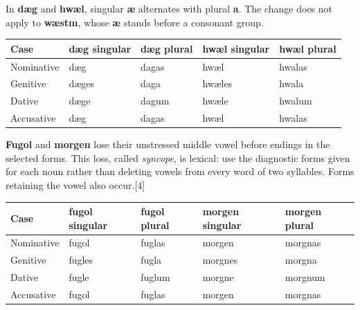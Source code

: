 In \textbf{dæg} and \textbf{hwæl}, singular \textbf{æ} alternates with plural \textbf{a}. The change does not apply to \textbf{wæstm}, whose \textbf{æ} stands before a consonant group.

\par\begingroup
\fontsize{10.5}{13.2}\selectfont
\setlength{\LTleft}{0pt}\setlength{\LTright}{\fill}
\noindent
\begin{tabular}{@{}>{\raggedright\arraybackslash}p{22.0mm}>{\raggedright\arraybackslash}p{22.688mm}>{\raggedright\arraybackslash}p{22.688mm}>{\raggedright\arraybackslash}p{22.688mm}>{\raggedright\arraybackslash}p{22.688mm}@{}}
\toprule
\textbf{Case} & \textbf{dæg singular} & \textbf{dæg plural} & \textbf{hwæl singular} & \textbf{hwæl plural} \\
\midrule
Nominative & dæg & dagas & hwæl & hwalas \\
Genitive & dæges & daga & hwæles & hwala \\
Dative & dæge & dagum & hwæle & hwalum \\
Accusative & dæg & dagas & hwæl & hwalas \\
\bottomrule
\end{tabular}
\par\endgroup

\textbf{Fugol} and \textbf{morgen} lose their unstressed middle vowel before endings in the selected forms. This loss, called \emph{syncope}, is lexical: use the diagnostic forms given for each noun rather than deleting vowels from every word of two syllables. Forms retaining the vowel also occur.[4]

\par\begingroup
\fontsize{10.5}{13.2}\selectfont
\setlength{\LTleft}{0pt}\setlength{\LTright}{\fill}
\noindent
\begin{tabular}{@{}>{\raggedright\arraybackslash}p{22.0mm}>{\raggedright\arraybackslash}p{22.688mm}>{\raggedright\arraybackslash}p{22.688mm}>{\raggedright\arraybackslash}p{22.688mm}>{\raggedright\arraybackslash}p{22.688mm}@{}}
\toprule
\textbf{Case} & \textbf{fugol singular} & \textbf{fugol plural} & \textbf{morgen singular} & \textbf{morgen plural} \\
\midrule
Nominative & fugol & fuglas & morgen & morgnas \\
Genitive & fugles & fugla & morgnes & morgna \\
Dative & fugle & fuglum & morgne & morgnum \\
Accusative & fugol & fuglas & morgen & morgnas \\
\bottomrule
\end{tabular}
\par\endgroup

